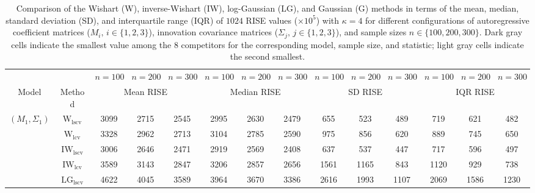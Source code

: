 \begin{table}[!ht]
\caption{Comparison of the Wishart (W), inverse-Wishart (IW), log-Gaussian (LG), and Gaussian (G) methods in terms of the mean, median, standard deviation (SD), and interquartile range (IQR) of $1024$ RISE values ($\times 10^5$) with $\kappa = 4$ for different configurations of autoregressive coefficient matrices ($M_i, \, i\in \{1,2,3\}$), innovation covariance matrices ($\Sigma_j, \, j\in \{1,2,3\}$), and sample sizes $n \in \{100, 200, 300\}$. Dark gray cells indicate the smallest value among the 8 competitors for the corresponding model, sample size, and statistic; light gray cells indicate the second smallest.}
\label{tab:summary}

\fontsize{7.9}{7}\selectfont\renewcommand{\arraystretch}{0}
\setlength{\tabcolsep}{1.2pt}
\setlength{\aboverulesep}{0.35ex}
\setlength{\belowrulesep}{0.35ex}
\centering
{
\begin{tabular}{@{}cc|ccc|ccc|ccc|ccc@{}}
\toprule
\multicolumn{2}{c|}{} & $n = 100$ & $n = 200$ & $n = 300$ & $n = 100$ & $n = 200$ & $n = 300$ & $n = 100$ & $n = 200$ & $n = 300$ & $n = 100$ & $n = 200$ & $n = 300$ \\
\cmidrule(r){1-2}\cmidrule(lr){3-5}\cmidrule(lr){6-8}\cmidrule(lr){9-11}\cmidrule(l){12-14}
Model & Method & \multicolumn{3}{c|}{Mean RISE} & \multicolumn{3}{c|}{Median RISE} & \multicolumn{3}{c|}{SD RISE} & \multicolumn{3}{c}{IQR RISE} \\
\midrule
$(M_1,\Sigma_1)$ & $\mathrm{W}_{\mathrm{lscv}}$ & \cellcolor{black!10}3099 & \cellcolor{black!10}2715 & \cellcolor{black!10}2545 & \cellcolor{black!10}2995 & \cellcolor{black!10}2630 & \cellcolor{black!10}2479 & 655 & 523 & 489 & 719 & 621 & \cellcolor{black!10}482 \\ 
 & $\mathrm{W}_{\mathrm{lcv}}$ & 3328 & 2962 & 2713 & 3104 & 2785 & 2590 & 975 & 856 & 620 & 889 & 745 & 650 \\ 
 & $\mathrm{IW}_{\mathrm{lscv}}$ & \cellcolor{black!30}3006 & \cellcolor{black!30}2646 & \cellcolor{black!30}2471 & \cellcolor{black!30}2919 & \cellcolor{black!30}2569 & \cellcolor{black!30}2408 & 637 & 537 & 447 & \cellcolor{black!10}717 & \cellcolor{black!10}596 & 497 \\ 
 & $\mathrm{IW}_{\mathrm{lcv}}$ & 3589 & 3143 & 2847 & 3206 & 2857 & 2656 & 1561 & 1165 & 843 & 1120 & 929 & 738 \\ 
 & $\mathrm{LG}_{\mathrm{lscv}}$ & 4622 & 4045 & 3589 & 3964 & 3670 & 3386 & 2616 & 1993 & 1107 & 2069 & 1586 & 1230 \\ 

\end{tabular}}
\end{table}
